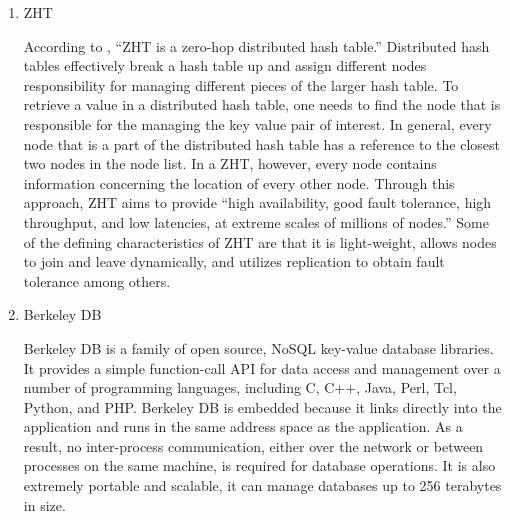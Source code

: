 \begin{enumerate}
\item {} 
ZHT

According to \label{\detokenize{i524/technologies:id400}}{\hyperref[\detokenize{i524/technologies:datasys}]{\sphinxcrossref{{[}344{]}}}}, “ZHT is a zero-hop distributed hash
table.” Distributed hash tables effectively break a hash table up
and assign different nodes responsibility for managing different
pieces of the larger hash table. \label{\detokenize{i524/technologies:id401}}{\hyperref[\detokenize{i524/technologies:wiley}]{\sphinxcrossref{{[}345{]}}}} To retrieve a
value in a distributed hash table, one needs to find the node
that is responsible for the managing the key value pair of
interest. \label{\detokenize{i524/technologies:id402}}{\hyperref[\detokenize{i524/technologies:wiley}]{\sphinxcrossref{{[}345{]}}}} In general, every node that is a part of
the distributed hash table has a reference to the closest two
nodes in the node list. \label{\detokenize{i524/technologies:id403}}{\hyperref[\detokenize{i524/technologies:wiley}]{\sphinxcrossref{{[}345{]}}}} In a ZHT, however, every
node contains information concerning the location of every other
node. \label{\detokenize{i524/technologies:id404}}{\hyperref[\detokenize{i524/technologies:li}]{\sphinxcrossref{{[}346{]}}}} Through this approach, ZHT aims to provide “high
availability, good fault tolerance, high throughput, and low
latencies, at extreme scales of millions of nodes.” \label{\detokenize{i524/technologies:id405}}{\hyperref[\detokenize{i524/technologies:li}]{\sphinxcrossref{{[}346{]}}}}
Some of the defining characteristics of ZHT are that it is
light-weight, allows nodes to join and leave dynamically, and
utilizes replication to obtain fault tolerance among
others. \label{\detokenize{i524/technologies:id406}}{\hyperref[\detokenize{i524/technologies:li}]{\sphinxcrossref{{[}346{]}}}}

\item {} 
Berkeley DB

Berkeley DB is a family of open source, NoSQL key-value database
libraries.  \label{\detokenize{i524/technologies:id407}}{\hyperref[\detokenize{i524/technologies:www-bdb-wiki}]{\sphinxcrossref{{[}347{]}}}} It provides a simple
function-call API for data access and management over a number of
programming languages, including C, C++, Java, Perl, Tcl, Python,
and PHP. Berkeley DB is embedded because it links directly into
the application and runs in the same address space as the
application. \label{\detokenize{i524/technologies:id408}}{\hyperref[\detokenize{i524/technologies:www-bdb-stanford}]{\sphinxcrossref{{[}348{]}}}} As a result, no
inter-process communication, either over the network or between
processes on the same machine, is required for database
operations. It is also extremely portable and scalable, it can
manage databases up to 256 terabytes in size.


\end{enumerate}
